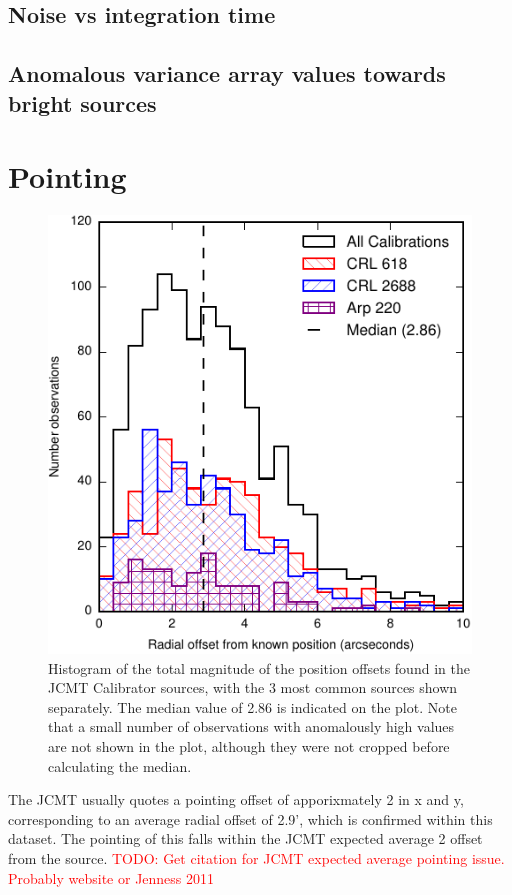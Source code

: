\documentclass[twocolumn]{aastex6}
\newcommand{\todo}[1]{\textcolor{red}{TODO: #1}}
\begin{document}
\subsection{Noise vs integration time}
\subsection{Anomalous variance array values towards bright sources}

\section{Pointing}
\begin{figure}
  \centering
  \includegraphics{pointing-offsets-by-source.pdf}
  \caption{Histogram of the total magnitude of the position offsets
    found in the JCMT Calibrator sources, with the 3 most common
    sources shown separately. The median value of 2.86\arcsec{} is
    indicated on the plot. Note that a small number of observations
    with anomalously high values are not shown in the plot, although
    they were not cropped before calculating the median.}
  \label{fig:pointing}
\end{figure}

The JCMT usually quotes a pointing offset of apporixmately 2\arcsec{}
in x and y, corresponding to an average radial offset of
2.9'\arcsec{}, which is confirmed within this dataset.
The pointing of this falls within the JCMT expected average 2\arcsec{} offset
from the source. \todo{Get citation for JCMT expected average pointing
  issue. Probably website or Jenness 2011}
\end{document}
